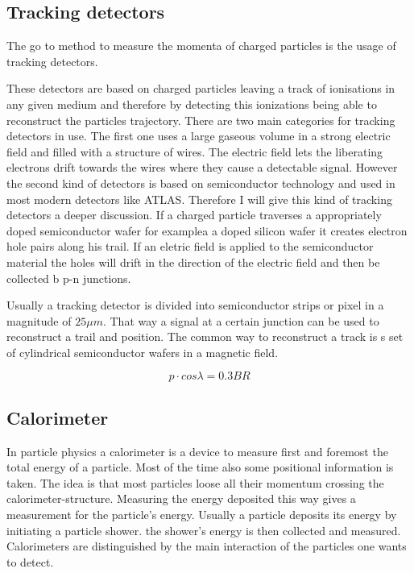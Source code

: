\subsection{Tracking detectors}

The go to method to measure the momenta of charged particles is the usage of tracking detectors.

These detectors are based on charged particles leaving a track of ionisations in any given medium and therefore by detecting this ionizations being able to reconstruct the particles trajectory.
There are two main categories for tracking detectors in use. The first one uses a large gaseous volume in a strong electric field and filled with a structure of wires. The electric field lets the liberating electrons drift towards the wires where they cause a detectable signal.
However the second kind of detectors is based on semiconductor technology and used in most modern detectors like ATLAS. Therefore I will give this kind of tracking detectors a deeper discussion.
If a charged particle traverses a appropriately doped semiconductor wafer for examplea a doped silicon wafer it creates electron hole pairs along his trail. If an eletric field is applied to the semiconductor material the holes will drift in the direction of the electric field and then be collected b p-n junctions.

Usually a tracking detector is divided into semiconductor strips or pixel in a magnitude of $25 \mu m$. That way a signal at a certain junction can be used to reconstruct a trail and position. The common way to reconstruct a track is s set of cylindrical semiconductor wafers in a magnetic field.


\begin{equation}
p \cdot cos \lambda = 0.3 BR
\end{equation}



\subsection{Calorimeter}

In particle physics a calorimeter is a device to measure first and foremost the total energy of a particle. Most of the time also some positional information is taken.
The idea is that most particles loose all their momentum crossing the calorimeter-structure. Measuring the energy deposited this way gives a measurement for the particle's energy.
Usually a particle deposits its energy by initiating a particle shower. the shower's energy is then collected and measured.
Calorimeters are distinguished by the main interaction of the particles one wants to detect. 
